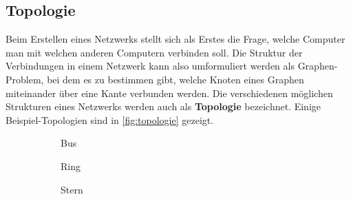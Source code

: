 \subsection{Topologie}
Beim Erstellen eines Netzwerks stellt sich als Erstes die Frage, welche Computer man mit welchen anderen Computern verbinden soll. Die Struktur der Verbindungen in einem Netzwerk kann also umformuliert werden als Graphen-Problem, bei dem es zu bestimmen gibt, welche Knoten eines Graphen miteinander über eine Kante verbunden werden. Die verschiedenen möglichen Strukturen eines Netzwerks werden auch als \textbf{Topologie} bezeichnet. Einige Beispiel-Topologien sind in \cref{fig:topologie} gezeigt.
\begin{figure}[H]
	\centering
	\begin{subfigure}[b]{0.25\textwidth}
		\centering
		\caption{Bus}
	\end{subfigure}%
	\begin{subfigure}[b]{0.25\textwidth}
		\centering
		\caption{Ring}
	\end{subfigure}
	\begin{subfigure}[b]{0.25\textwidth}
		\centering
		\caption{Stern}
	\end{subfigure}%
	\begin{subfigure}[b]{0.25\textwidth}
		\centering
\end{subfigure}
\end{figure}
